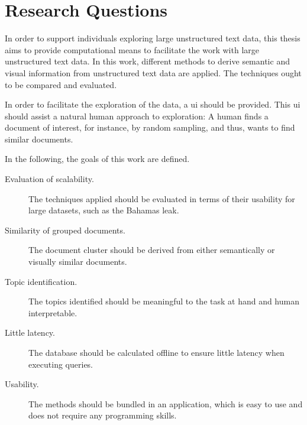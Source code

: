 \section{Research Questions}\label{sec:research-questions}

In order to support individuals exploring large unstructured text data, this thesis aims to provide computational means to facilitate the work with large unstructured text data.
In this work, different methods to derive semantic and visual information from unstructured text data are applied.
The techniques ought to be compared and evaluated.

In order to facilitate the exploration of the data, a \ac{ui} should be provided.
This \ac{ui} should assist a natural human approach to exploration:
A human finds a document of interest, for instance, by random sampling, and thus, wants to find similar documents.

In the following, the goals of this work are defined.
\begin{description}
    \item[Evaluation of scalability.]
    The techniques applied should be evaluated in terms of their usability for large datasets, such as the Bahamas leak.
    \item[Similarity of grouped documents.]
    The document cluster should be derived from either semantically or visually similar documents.
    \item[Topic identification.]
    The topics identified should be meaningful to the task at hand and human interpretable.  
    \item[Little latency.]
    The database should be calculated offline to ensure little latency when executing queries.
    \item[Usability.]
    The methods should be bundled in an application, which is easy to use and does not require any programming skills.
\end{description}